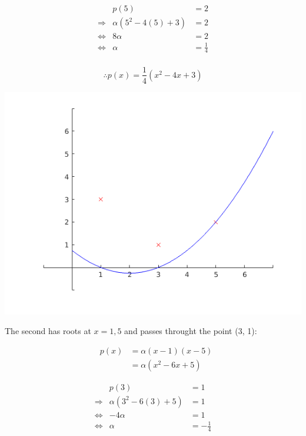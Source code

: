\documentclass[MathsNotesBase.tex]{subfiles}
\begin{document}
\begin{par}
$$\begin{array}{lcr}
&p(5)&=2 \\
\Longrightarrow &\alpha(5^2-4(5) + 3) &= 2 \\
\iff &8\alpha&=2\\
\iff &\alpha &= \frac{1}{4}\\
\end{array}$$
\end{par}

\begin{par}
$$\therefore p(x) = \frac{1}{4}(x^2-4x+3)$$
\end{par}


\begin{center}
\includegraphics[width=\linewidth]{figure_1}
\end{center}


\begin{par}
\begin{flushleft}
The second has roots at $x=1,5$ and passes throught the point (3, 1):
\end{flushleft}
\end{par}

\begin{par}
$$\begin{array}{lcr}
&p(x) &= \alpha(x-1)(x-5)\\
&&= \alpha(x^2-6x+5)
\end{array}$$
\end{par}

\begin{par}
$$\begin{array}{lcr}
&p(3)&=1 \\
\Longrightarrow &\alpha(3^2-6(3) + 5) &= 1 \\
\iff &-4\alpha&=1\\
\iff &\alpha &= -\frac{1}{4}\\
\end{array}$$
\end{par}
\end{document}
